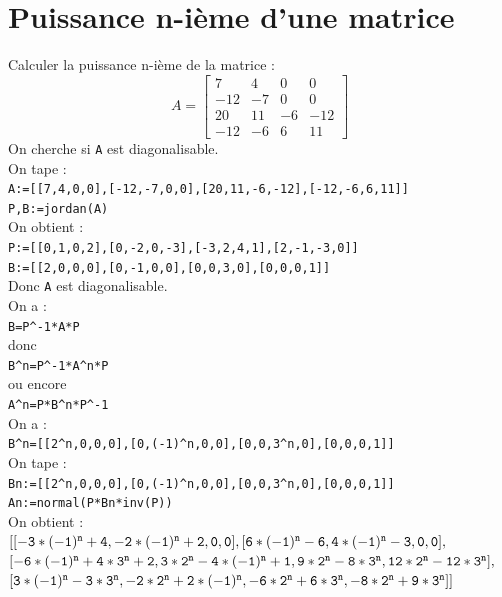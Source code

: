 \documentclass[a4paper,11pt]{book}
\begin{document}
\section{Puissance n-i\`eme d'une matrice}
Calculer la puissance  n-i\`eme de la matrice :\\
$$A=
\left [\begin{array}{rrrr}
7&4&0&0\\
-12&-7&0&0\\
20&11&-6&-12\\
-12&-6&6&11 
\end{array}
\right]$$
On cherche si {\tt A} est diagonalisable.\\
 On tape :\\
{\tt A:=[[7,4,0,0],[-12,-7,0,0],[20,11,-6,-12],[-12,-6,6,11]]}\\
{\tt P,B:=jordan(A)}\\
On obtient :\\
{\tt P:=[[0,1,0,2],[0,-2,0,-3],[-3,2,4,1],[2,-1,-3,0]]}\\
{\tt B:=[[2,0,0,0],[0,-1,0,0],[0,0,3,0],[0,0,0,1]]}\\
Donc {\tt A} est diagonalisable.\\
On a :\\
{\tt B=P\verb|^|{-1}*A*P}\\
donc \\
{\tt B\verb|^|n=P\verb|^|{-1}*A\verb|^|n*P}\\
ou encore\\
{\tt A\verb|^|n=P*B\verb|^|n*P\verb|^|{-1}}\\
On a :\\
{\tt B\verb|^|n=[[2\verb|^|n,0,0,0],[0,(-1)\verb|^|n,0,0],[0,0,3\verb|^|n,0],[0,0,0,1]]}\\
On tape :\\
{\tt Bn:=[[\verb|2^|n,0,0,0],[0,(-1)\verb|^|n,0,0],[0,0,3\verb|^|n,0],[0,0,0,1]]}\\
{\tt An:=normal(P*Bn*inv(P))}\\
On obtient :\\
${\tt [[-3*(-1)^n+4,-2*(-1)^n+2,0,0],[6*(-1)^n-6,4*(-1)^n-3,0,0],}$\\
${\tt [-6*(-1)^n+4*3^n+2,3*2^n-4*(-1)^n+1,9*2^n-8*3^n,12*2^n-12*3^n],}$\\
${\tt [3*(-1)^n-3*3^n,-2*2^n+2*(-1)^n,-6*2^n+6*3^n,-8*2^n+9*3^n]]}$
\end{document}

